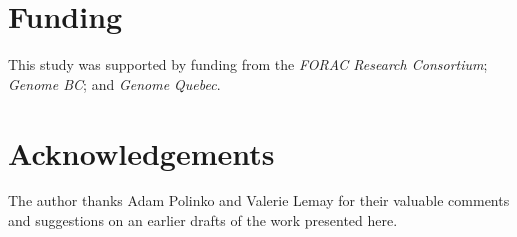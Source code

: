 \documentclass{foresj}
\begin{document}
  \section*{Funding}

This study was supported by funding from the \emph{FORAC Research
  Consortium}; \emph{Genome BC}; and \emph{Genome Quebec}.

\section*{Acknowledgements}

The author thanks Adam Polinko and Valerie Lemay for their valuable comments and
suggestions on an earlier drafts of the work presented here.


%
%

\clearpage
\end{document}
